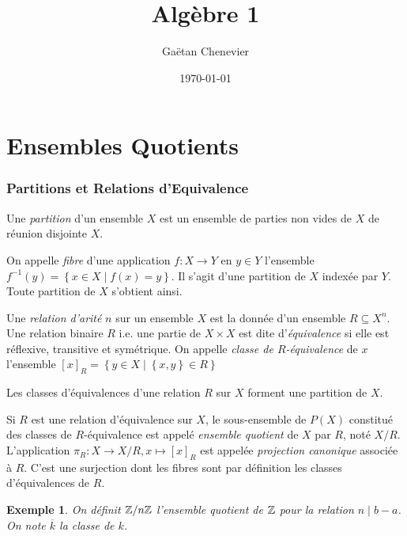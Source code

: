 \documentclass{cours}
\title{Algèbre 1}
\author{Gaëtan Chenevier}
\date{\today}
\newtheorem{example}{Exemple}[section]
\begin{document}
\part{Ensembles Quotients}
\section{Partitions et Relations d'Equivalence}
\begin{definition}
    Une \emph{partition} d'un ensemble $X$ est un ensemble de parties non vides de $X$ de réunion disjointe $X$. 
\end{definition}
\begin{definition}
    On appelle \emph{fibre} d'une application $f : X \rightarrow Y$ en $y \in Y$ l'ensemble $f^{-1}(y) = \left\{x \in X \mid f(x) = y\right\}$. Il s'agit d'une partition de $X$ indexée par $Y$. Toute partition de $X$ s'obtient ainsi. 
\end{definition}

\begin{definition}
    Une \emph{relation d'arité} $n$ sur un ensemble $X$ est la donnée d'un ensemble $R \subseteq X^{n}$. Une relation binaire $R$ i.e. une partie de $X\times X$ est dite d'\emph{équivalence} si elle est réflexive, transitive et symétrique. On appelle \emph{classe de $R$-équivalence} de $x$ l'ensemble $\left[x\right]_{R} = \left\{y \in X \mid \left\{x, y\right\} \in R\right\}$
\end{definition}

\begin{proposition}\label{partclassdeq}
    Les classes d'équivalences d'une relation $R$ sur $X$ forment une partition de $X$. 
\end{proposition}

\begin{definition}
    Si $R$ est une relation d'équivalence sur $X$, le sous-ensemble de $P(X)$ constitué des classes de $R$-équivalence est appelé \emph{ensemble quotient} de $X$ par $R$, noté $X/R$. L'application $\pi_{R} : X \rightarrow X/R, x \mapsto \left[x\right]_{R}$ est appelée \emph{projection canonique} associée à $R$. C'est une surjection dont les fibres sont par définition les classes d'équivalences de $R$.
\end{definition}

\begin{example}
    On définit $\mathbb{Z}/n\mathbb{Z}$ l'ensemble quotient de $\mathbb{Z}$ pour la relation $n \mid b - a$. On note $\overline{k}$ la classe de $k$.
\end{example}
\end{document}
